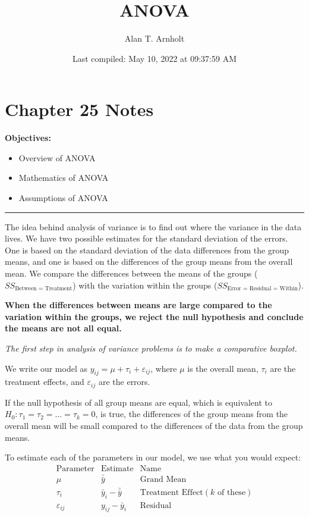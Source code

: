 \documentclass[
]{article}
\title{ANOVA}
\author{Alan T. Arnholt}
\date{Last compiled: May 10, 2022 at 09:37:59 AM}
\begin{document}
\maketitle

{
\setcounter{tocdepth}{2}
\tableofcontents
}
\hypertarget{chapter-25-notes}{%
\section*{Chapter 25 Notes}\label{chapter-25-notes}}

\textbf{Objectives:}

\begin{itemize}
\item
  Overview of ANOVA
\item
  Mathematics of ANOVA
\item
  Assumptions of ANOVA
\end{itemize}

\begin{center}\rule{0.5\linewidth}{0.5pt}\end{center}

The idea behind analysis of variance is to find out where the variance in the data lives. We have two possible estimates for the standard deviation of the errors. One is based on the standard deviation of the data differences from the group means, and one is based on the differences of the group means from the overall mean. We compare the differences between the means of the groups (\(SS_{\text{Between = Treatment}}\)) with the variation within the groups (\(SS_\text{Error = Residual = Within}\)).

\textbf{When the differences between means are large compared to the variation within the groups, we reject the null hypothesis and conclude the means are not all equal.}

\emph{The first step in analysis of variance problems is to make a comparative boxplot.}

We write our model as \(y_{ij}=\mu+\tau_i+\varepsilon_{ij}\), where \(\mu\) is the overall mean, \(\tau_i\) are the treatment effects, and \(\varepsilon_{ij}\) are the errors.

If the null hypothesis of all group means are equal, which is equivalent to \(H_0: \tau_1=\tau_2=\dots=\tau_k=0\), is true, the differences of the group means from the overall mean will be small compared to the differences of the data from the group means.

To estimate each of the parameters in our model, we use what you would expect:
\[\begin{array}{ccc}
\text{Parameter}&\text{Estimate}&\text{Name}\\
\mu&\bar{\bar{y}}&\text{Grand Mean}\\
\tau_i&\bar{y}_i - \bar{\bar{y}}&\text{Treatment Effect} (k \text{ of these})\\
\varepsilon_{ij}&y_{ij}-\bar{y}_i&\text{Residual}
\end{array}
\]
\end{document}
